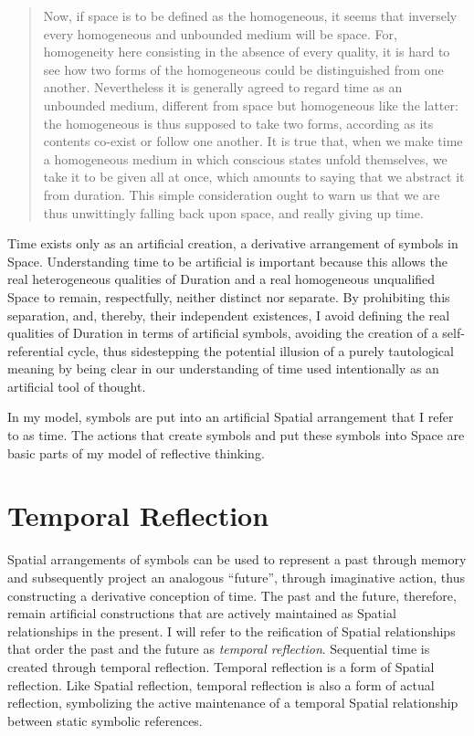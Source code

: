\begin{quote}
Now, if space is to be defined as the homogeneous, it seems that
inversely every homogeneous and unbounded medium will be space.  For,
homogeneity here consisting in the absence of every quality, it is
hard to see how two forms of the homogeneous could be distinguished
from one another.  Nevertheless it is generally agreed to regard time
as an unbounded medium, different from space but homogeneous like the
latter: the homogeneous is thus supposed to take two forms, according
as its contents co-exist or follow one another.  It is true that, when
we make time a homogeneous medium in which conscious states unfold
themselves, we take it to be given all at once, which amounts to
saying that we abstract it from duration.  This simple consideration
ought to warn us that we are thus unwittingly falling back upon space,
and really giving up time.
\end{quote}

Time exists only as an artificial creation, a derivative arrangement
of symbols in Space.  Understanding time to be artificial is important
because this allows the real heterogeneous qualities of Duration and a
real homogeneous unqualified Space to remain, respectfully, neither
distinct nor separate.  By prohibiting this separation, and, thereby,
their independent existences, I avoid defining the real qualities of
Duration in terms of artificial symbols, avoiding the creation of a
self-referential cycle, thus sidestepping the potential illusion of a
purely tautological meaning by being clear in our understanding of
time used intentionally as an artificial tool of thought.

In my model, symbols are put into an artificial Spatial arrangement
that I refer to as time.  The actions that create symbols and put
these symbols into Space are basic parts of my model of reflective
thinking.

\section{Temporal Reflection}

Spatial arrangements of symbols can be used to represent a past
through memory and subsequently project an analogous ``future'',
through imaginative action, thus constructing a derivative conception
of time.  The past and the future, therefore, remain artificial
constructions that are actively maintained as Spatial relationships in
the present.  I will refer to the reification of Spatial relationships
that order the past and the future as \emph{temporal reflection}.
Sequential time is created through temporal reflection.  Temporal
reflection is a form of Spatial reflection.  Like Spatial reflection,
temporal reflection is also a form of actual reflection, symbolizing
the active maintenance of a temporal Spatial relationship between
static symbolic references.

